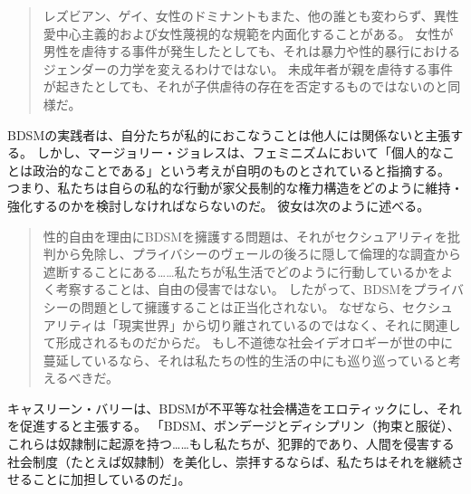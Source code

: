 \documentclass[paper=a4,book,openany]{jlreq}
\newcommand{\ig}[1]{}           %
\begin{document}
\begin{quote}
  レズビアン、ゲイ、女性のドミナントもまた、他の誰とも変わらず、異性愛中心主義的および女性蔑視的な規範を内面化することがある。
女性が男性を虐待する事件が発生したとしても、それは暴力や性的暴行におけるジェンダーの力学を変えるわけではない。
未成年者が親を虐待する事件が起きたとしても、それが子供虐待の存在を否定するものではないのと同様だ。
\citep{egbert15:_bdsm_faq_frequen_asser_quibb}
\end{quote}

BDSMの実践者は、自分たちが私的におこなうことは他人には関係ないと主張する。
しかし、マージョリー・ジョレスは、フェミニズムにおいて「個人的なことは政治的なことである」という考えが自明のものとされていると指摘する。
つまり、私たちは自らの私的な行動が家父長制的な権力構造をどのように維持・強化するのかを検討しなければならないのだ。
彼女は次のように述べる。

\begin{quote}
  性的自由を理由にBDSMを擁護する問題は、それがセクシュアリティを批判から免除し、プライバシーのヴェールの後ろに隠して倫理的な調査から遮断することにある……私たちが私生活でどのように行動しているかをよく考察することは、自由の侵害ではない。
したがって、BDSMをプライバシーの問題として擁護することは正当化されない。
なぜなら、セクシュアリティは「現実世界」から切り離されているのではなく、それに関連して形成されるものだからだ。
もし不道徳な社会イデオロギーが世の中に蔓延しているなら、それは私たちの性的生活の中にも巡り巡っていると考えるべきだ。
\citep[p.268]{jolles15:_pleas_pain_femin_polit_rough_sex}

\end{quote}

キャスリーン・バリー\ig{Barry}は、BDSMが不平等な社会構造をエロティックにし、それを促進すると主張する。
「BDSM、ボンデージとディシプリン（拘束と服従）、これらは奴隷制に起源を持つ……もし私たちが、犯罪的であり、人間を侵害する社会制度（たとえば奴隷制）を美化し、崇拝するならば、私たちはそれを継続させることに加担しているのだ」\citep{murphy12:_part_two_two_part_series_bdsm_femin}。
\ig{Meghan Murphy}
\end{document}
